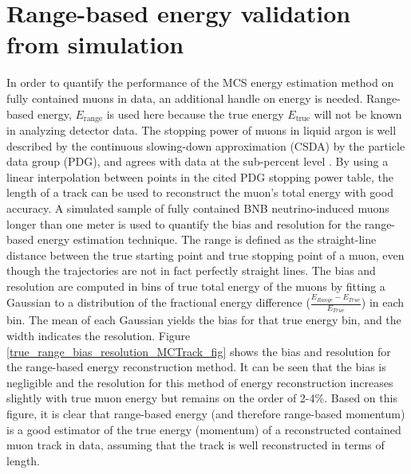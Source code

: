 \documentclass[a4paper,11pt]{article}
\begin{document}
\section{Range-based energy validation from simulation}\label{Range_Energy_Validation_section}
In order to quantify the performance of the MCS energy estimation method on fully contained muons in data, an additional handle on energy is needed. Range-based energy, $E_{\text{range}}$ is used here because the true energy $E_{\text{true}}$ will not be known in analyzing detector data. The stopping power of muons in liquid argon is well described by the continuous slowing-down approximation (CSDA) by the particle data group (PDG), and agrees with data at the sub-percent level \cite{MIPenergysource} \cite{PDG_spline_table} \cite{NISTdata}. By using a linear interpolation between points in the cited PDG stopping power table, the length of a track can be used to reconstruct the muon's total energy with good accuracy. A simulated sample of fully contained BNB neutrino-induced muons longer than one meter is used to quantify the bias and resolution for the range-based energy estimation technique. The range is defined as the straight-line distance between the true starting point and true stopping point of a muon, even though the trajectories are not in fact perfectly straight lines. The bias and resolution are computed in bins of true total energy of the muons by fitting a Gaussian to a distribution of the fractional energy difference ($\frac{E_{Range}-E_{True}}{E_{True}}$) in each bin. The mean of each Gaussian yields the bias for that true energy bin, and the width indicates the resolution. Figure \ref{true_range_bias_resolution_MCTrack_fig} shows the bias and resolution for the range-based energy reconstruction method. It can be seen that the bias is negligible and the resolution for this method of energy reconstruction increases slightly with true muon energy but remains on the order of 2-4\%. Based on this figure, it is clear that range-based energy (and therefore range-based momentum) is a good estimator of the true energy (momentum) of a reconstructed contained muon track in data, assuming that the track is well reconstructed in terms of length.
\end{document}
